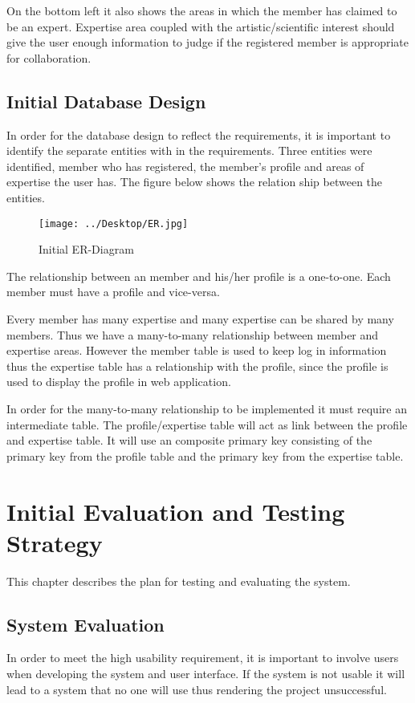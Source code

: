 \documentclass[a4paper,oneside,11pt]{report}
\begin{document}
On the bottom left it also shows the areas in which the member has claimed to be an expert. Expertise area coupled with the artistic/scientific interest should give the user enough information to judge if the registered member is appropriate for collaboration.
\newpage

\section{Initial Database Design}
In order for the database design to reflect the requirements, it is important to identify the separate entities with in the requirements. Three entities were identified, member who has registered, the member's profile and areas of expertise the user has. The figure below shows the relation ship between the entities.

\begin{figure}[!ht]
\centering
\texttt{[image: ../Desktop/ER.jpg]}
\caption{Initial ER-Diagram}
\end{figure}
The relationship between an member and his/her profile is a one-to-one. Each member must have a profile and vice-versa.

Every member has many expertise and many expertise can be shared by many members. Thus we have a many-to-many relationship between member and expertise areas. However the member table is used to keep log in information thus the expertise table has a relationship with the profile, since the profile is used to display the profile in web application.

In order for the many-to-many relationship to be implemented it must require an intermediate table. The profile/expertise table will act as link between the profile and expertise table. It will use an composite primary key consisting of the primary key from the profile table and the primary key from the expertise table.
\chapter{Initial Evaluation and Testing Strategy}
This chapter describes the plan for testing and evaluating the system.
\section{System Evaluation}
In order to meet the high usability requirement, it is important to involve users when developing the system and user interface. If the system is not usable it will lead to a system that no one will use thus rendering the project unsuccessful.
\end{document}
